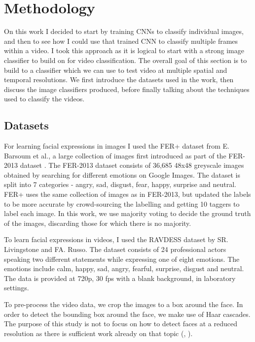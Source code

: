 \documentclass[sigconf]{acmart}
\begin{document}
{\section{Methodology}
On this work I decided to start by training CNNs to classify individual
images, and then to see how I could use that trained CNN to classify multiple
frames within a video. I took this approach as it is logical to start with a
strong image classifier to build on for video classification.
The overall goal of this section is to build to a classifier which we can use to test
video at multiple spatial and temporal resolutions. We first introduce the
datasets used in the work, then discuss the image classifiers produced, before
finally talking about the techniques used to classify the videos.

\subsection{Datasets}

For learning facial expressions in images I used the FER+ dataset
\cite{barsoum2016training} from E. Barsoum et al., a large collection of
images first introduced as part of the FER-2013 dataset \cite{goodfellow2013challenges}.
The FER-2013 dataset consists of 36,685 48x48 greyscale images obtained
by searching for different emotions on Google Images. The dataset is split
into 7 categories - angry, sad, disgust, fear, happy, surprise and neutral.
FER+ uses the same collection of images as in FER-2013, but updated the labels
to be more accurate by crowd-sourcing the labelling and getting 10 taggers to
label each image. In this work, we use majority voting to decide the ground
truth of the images, discarding those for which there is no majority. 

To learn facial expressions in videos, I used the RAVDESS
\cite{livingstone2018ryerson} dataset by SR. Livingstone and FA. Russo. The
dataset consists of 24 professional actors speaking two different statements
while expressing one of eight emotions. The emotions include calm, happy, sad,
angry, fearful, surprise, disgust and neutral. The data is provided at 720p,
30 fps with a blank background, in laboratory settings.

To pre-process the video data, we crop the images to a box around the face. In
order to detect the bounding box around the face, we make use of Haar
cascades. The purpose of this study is not to focus on how to detect faces at
a reduced resolution as there is sufficient work already on that topic
(\cite{zheng2010face}, \cite{tian2004evaluation}).

}
\end{document}
